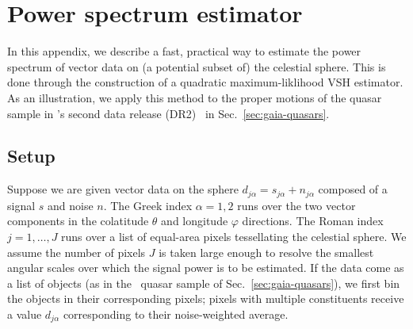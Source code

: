 \documentclass[prd,aps,twocolumn,nofootinbib,superscriptaddress,preprintnumbers,balancelastpage,longbibliography,floatfix]{revtex4-1}
\begin{document}
\section{Power spectrum estimator}\label{app:estimator}

In this appendix, we describe a fast, practical way to estimate the power spectrum of vector data on (a potential subset of) the celestial sphere. This is done through the construction of a quadratic maximum-liklihood VSH estimator. As an illustration, we apply this method to the proper motions of the quasar sample in \Gaia's second data release (DR2)~\cite{Prusti:2016bjo,Brown:2018dum} in Sec.~\ref{sec:gaia-quasars}.

\subsection{Setup}\label{app:estimator-setup}
Suppose we are given vector data on the sphere $d_{j\alpha} = s_{j\alpha} + n_{j\alpha}$ composed of a signal $s$ and noise $n$. The Greek index $\alpha = 1,2$ runs over the two vector components in the colatitude $\theta$ and longitude $\varphi$ directions.
The Roman index $j = 1, \dots, J$ runs over a list of equal-area pixels tessellating the celestial sphere.  We assume the number of pixels $J$ is taken large enough to resolve the smallest angular scales over which the signal power is to be estimated. If the data come as a list of objects (as in the \Gaia~quasar sample of Sec.~\ref{sec:gaia-quasars}), we first bin the objects in their corresponding pixels; pixels with multiple constituents receive a value $d_{j\alpha}$ corresponding to their noise-weighted average.
\end{document}
